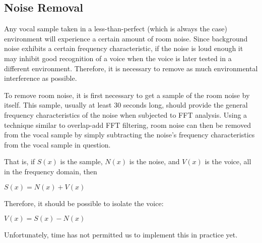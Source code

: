 \subsection{Noise Removal}

Any vocal sample taken in a less-than-perfect (which is always the case) environment will experience a certain
amount of room noise.  Since background noise exhibits a certain frequency characteristic,
if the noise is loud enough it may inhibit good recognition of a voice when the voice is
later tested in a different environment.  Therefore, it is necessary to remove as much
environmental interference as possible.

To remove room noise, it is first necessary to get a sample of the room noise by itself.
This sample, usually at least 30 seconds long, should provide the general frequency
characteristics of the noise when subjected to FFT analysis.  Using a technique similar
to overlap-add FFT filtering, room noise can then be removed from the vocal sample by
simply subtracting the noise's frequency characteristics from the vocal sample in question.

That is, if $S(x)$ is the sample, $N(x)$ is the noise, and $V(x)$ is the voice, all in the
frequency domain, then

\begin{center}$S(x) = N(x) + V(x)$\end{center}

Therefore, it should be possible to isolate the voice:

\begin{center}$V(x) = S(x) - N(x)$\end{center}

Unfortunately, time has not permitted us to implement this in practice yet.
